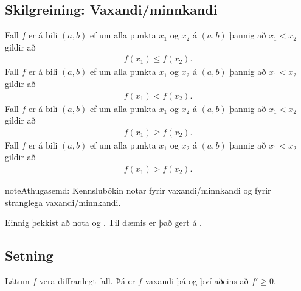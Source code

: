 \documentclass[a4paper,10pt,icelandic]{sphinxmanual}
\begin{document}
\subsection{Skilgreining: Vaxandi/minnkandi}
\label{\detokenize{kafli03:skilgreining-vaxandi-minnkandi}}\label{\detokenize{kafli03:index-9}}
Fall \(f\) er  á bili \((a,b)\) ef um
alla punkta \(x_1\) og \(x_2\) á \((a,b)\) þannig að
\(x_1 < x_2\) gildir að
\begin{equation*}
\begin{split}f(x_1) \leq f(x_2).\end{split}
\end{equation*}
Fall \(f\) er  á bili \((a,b)\)
ef um alla punkta \(x_1\) og \(x_2\) á \((a,b)\) þannig að
\(x_1 < x_2\) gildir að
\begin{equation*}
\begin{split}f(x_1) < f(x_2).\end{split}
\end{equation*}
Fall \(f\) er  á bili \((a,b)\) ef um
alla punkta \(x_1\) og \(x_2\) á \((a,b)\) þannig að
\(x_1 < x_2\) gildir að
\begin{equation*}
\begin{split}f(x_1) \geq f(x_2).\end{split}
\end{equation*}
Fall \(f\) er  á bili
\((a,b)\) ef um alla punkta \(x_1\) og \(x_2\) á
\((a,b)\) þannig að \(x_1 < x_2\) gildir að
\begin{equation*}
\begin{split}f(x_1) > f(x_2).\end{split}
\end{equation*}
\begin{sphinxadmonition}{note}{Athugasemd:}
Kennslubókin notar  fyrir vaxandi/minnkandi og
 fyrir stranglega vaxandi/minnkandi.

Einnig þekkist að nota  og .
Til dæmis er það gert á .
\end{sphinxadmonition}


\subsection{Setning}
\label{\detokenize{kafli03:vaxandieoae}}\label{\detokenize{kafli03:id15}}
Látum \(f\) vera diffranlegt fall. Þá er \(f\) vaxandi þá og því
aðeins að \(f' \geq 0\).
\end{document}
